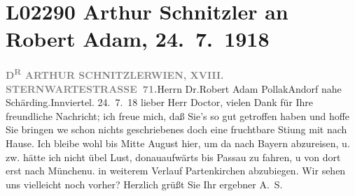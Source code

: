 

\section[Arthur Schnitzler an Robert Adam, 24. 7. 1918]{L02290 Arthur Schnitzler an Robert Adam, 24. 7. 1918}
\nopagebreak{}
\rehead{ }\normalsize\beginnumbering{}
\toendnotes[C]{\smallbreak\pagebreak[2]}
\toendnotes[C]{\smallbreak}
\pstart{}{\pb}\textcolor{gray}{\textbf{D\textsuperscript{R} ARTHUR SCHNITZLER}}\pend{}\pstart{}\textcolor{gray}{\textbf{WIEN, XVIII. STERNWARTESTRASSE 71.}}\pend{}{\bigskip}\pstart{}Herrn Dr.\pend{}\pstart{}Robert Adam Pollak\pend{}\pstart{}Andorf nahe Schärding.\pend{}\pstart{}Innviertel.\pend{}{\bigskip}\vspace{1em}
\pstart
           \raggedleft{}{\pb}24. 7. 18\pend
           \vspace{0.5em}
\pstart
           lieber Herr Doctor,  vielen Dank für Ihre freundliche Nachricht; ich
               freue mich, daß Sie’s so gut getroffen haben und hoffe Sie bringen we{\geminationn} schon nichts geschriebenes doch eine fruchtbare Sti{\geminationm}ung mit nach Hause. Ich bleibe wohl bis Mitte August hier, um da{\geminationn} nach Bayern abzureisen, u. zw. hätte ich nicht übel Lust, donauaufwärts bis Passau zu fahren, u von dort erst nach Münchenu. in weiterem Verlauf Partenkirchen abzubiegen. Wir sehen uns vielleicht noch vorher? Herzlich
               grüßt Sie Ihr ergebner\pend
           \pstart \spacefill\mbox{A. S.}\pend{}\endnumbering{}  \newcommand{\dateiname}{L02290}\newcommand{\titel}{Arthur Schnitzler an Robert Adam, 24. 7. 1918}\newcommand{\editorInnen}{Martin Anton Müller und Gerd-Hermann Susen}

